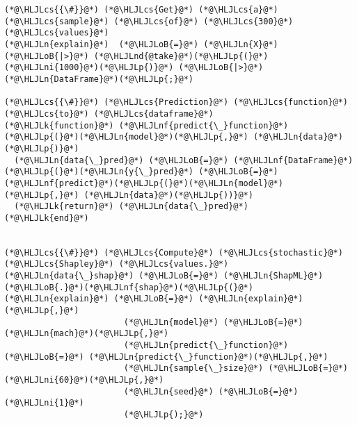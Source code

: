 \documentclass[12pt,a4paper]{article}
\newcommand{\HLJLk}[1]{\textcolor[RGB]{148,91,176}{\textbf{#1}}}
\newcommand{\HLJLn}[1]{#1}
\newcommand{\HLJLnd}[1]{\textcolor[RGB]{214,102,97}{#1}}
\newcommand{\HLJLnf}[1]{\textcolor[RGB]{66,102,213}{#1}}
\newcommand{\HLJLni}[1]{\textcolor[RGB]{59,151,46}{#1}}
\newcommand{\HLJLoB}[1]{\textcolor[RGB]{102,102,102}{\textbf{#1}}}
\newcommand{\HLJLp}[1]{#1}
\newcommand{\HLJLcs}[1]{\textcolor[RGB]{153,153,119}{\textit{#1}}}
\begin{document}
\begin{lstlisting}
(*@\HLJLcs{{\#}}@*) (*@\HLJLcs{Get}@*) (*@\HLJLcs{a}@*) (*@\HLJLcs{sample}@*) (*@\HLJLcs{of}@*) (*@\HLJLcs{300}@*) (*@\HLJLcs{values}@*)
(*@\HLJLn{explain}@*)  (*@\HLJLoB{=}@*) (*@\HLJLn{X}@*) (*@\HLJLoB{|>}@*) (*@\HLJLnd{@take}@*)(*@\HLJLp{(}@*)(*@\HLJLni{1000}@*)(*@\HLJLp{)}@*) (*@\HLJLoB{|>}@*) (*@\HLJLn{DataFrame}@*)(*@\HLJLp{;}@*)

(*@\HLJLcs{{\#}}@*) (*@\HLJLcs{Prediction}@*) (*@\HLJLcs{function}@*) (*@\HLJLcs{to}@*) (*@\HLJLcs{dataframe}@*)
(*@\HLJLk{function}@*) (*@\HLJLnf{predict{\_}function}@*)(*@\HLJLp{(}@*)(*@\HLJLn{model}@*)(*@\HLJLp{,}@*) (*@\HLJLn{data}@*)(*@\HLJLp{)}@*)
  (*@\HLJLn{data{\_}pred}@*) (*@\HLJLoB{=}@*) (*@\HLJLnf{DataFrame}@*)(*@\HLJLp{(}@*)(*@\HLJLn{y{\_}pred}@*) (*@\HLJLoB{=}@*) (*@\HLJLnf{predict}@*)(*@\HLJLp{(}@*)(*@\HLJLn{model}@*)(*@\HLJLp{,}@*) (*@\HLJLn{data}@*)(*@\HLJLp{))}@*)
  (*@\HLJLk{return}@*) (*@\HLJLn{data{\_}pred}@*)
(*@\HLJLk{end}@*)


(*@\HLJLcs{{\#}}@*) (*@\HLJLcs{Compute}@*) (*@\HLJLcs{stochastic}@*) (*@\HLJLcs{Shapley}@*) (*@\HLJLcs{values.}@*)
(*@\HLJLn{data{\_}shap}@*) (*@\HLJLoB{=}@*) (*@\HLJLn{ShapML}@*)(*@\HLJLoB{.}@*)(*@\HLJLnf{shap}@*)(*@\HLJLp{(}@*)(*@\HLJLn{explain}@*) (*@\HLJLoB{=}@*) (*@\HLJLn{explain}@*)(*@\HLJLp{,}@*)
                        (*@\HLJLn{model}@*) (*@\HLJLoB{=}@*) (*@\HLJLn{mach}@*)(*@\HLJLp{,}@*)
                        (*@\HLJLn{predict{\_}function}@*) (*@\HLJLoB{=}@*) (*@\HLJLn{predict{\_}function}@*)(*@\HLJLp{,}@*)
                        (*@\HLJLn{sample{\_}size}@*) (*@\HLJLoB{=}@*) (*@\HLJLni{60}@*)(*@\HLJLp{,}@*)
                        (*@\HLJLn{seed}@*) (*@\HLJLoB{=}@*) (*@\HLJLni{1}@*)
                        (*@\HLJLp{);}@*)


\end{lstlisting}
\end{document}
